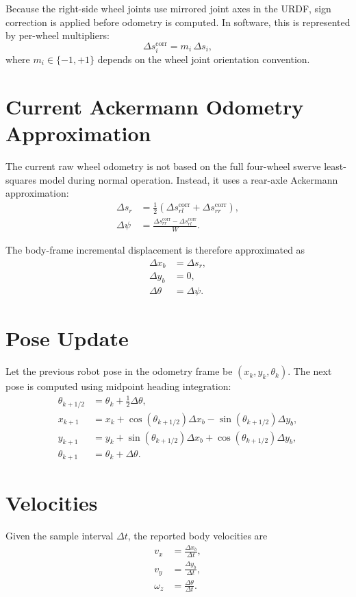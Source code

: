 \documentclass[12pt,a4paper]{report}
\begin{document}
Because the right-side wheel joints use mirrored joint axes in the URDF, sign correction is applied before odometry is computed. In software, this is represented by per-wheel multipliers:
\begin{equation}
\Delta s_i^{\text{corr}} = m_i \, \Delta s_i,
\end{equation}
where \(m_i \in \{-1, +1\}\) depends on the wheel joint orientation convention.

\section{Current Ackermann Odometry Approximation}
The current raw wheel odometry is not based on the full four-wheel swerve least-squares model during normal operation. Instead, it uses a rear-axle Ackermann approximation:
\begin{align}
\Delta s_r &= \frac{1}{2}\left(\Delta s_{rl}^{\text{corr}} + \Delta s_{rr}^{\text{corr}}\right), \\
\Delta \psi &= \frac{\Delta s_{rr}^{\text{corr}} - \Delta s_{rl}^{\text{corr}}}{W}.
\end{align}

The body-frame incremental displacement is therefore approximated as
\begin{align}
\Delta x_b &= \Delta s_r, \\
\Delta y_b &= 0, \\
\Delta \theta &= \Delta \psi.
\end{align}

\section{Pose Update}
Let the previous robot pose in the odometry frame be \((x_k, y_k, \theta_k)\). The next pose is computed using midpoint heading integration:
\begin{align}
\theta_{k+1/2} &= \theta_k + \frac{1}{2}\Delta \theta, \\
x_{k+1} &= x_k + \cos(\theta_{k+1/2})\Delta x_b - \sin(\theta_{k+1/2})\Delta y_b, \\
y_{k+1} &= y_k + \sin(\theta_{k+1/2})\Delta x_b + \cos(\theta_{k+1/2})\Delta y_b, \\
\theta_{k+1} &= \theta_k + \Delta \theta.
\end{align}

\section{Velocities}
Given the sample interval \(\Delta t\), the reported body velocities are
\begin{align}
v_x &= \frac{\Delta x_b}{\Delta t}, \\
v_y &= \frac{\Delta y_b}{\Delta t}, \\
\omega_z &= \frac{\Delta \theta}{\Delta t}.
\end{align}
\end{document}
